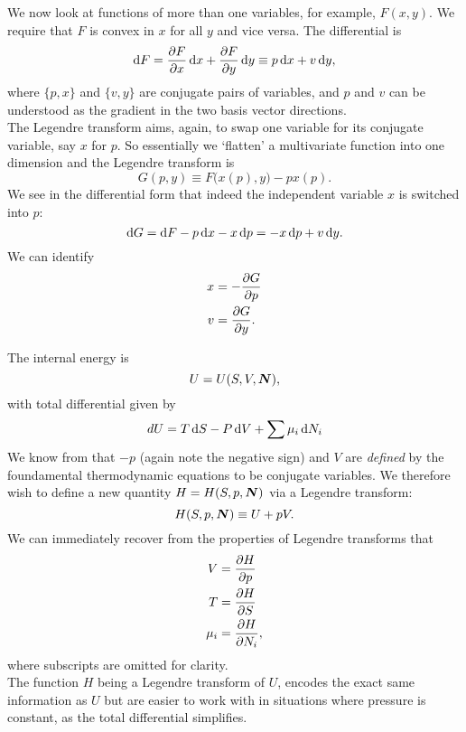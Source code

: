 We now look at functions of more than one variables, for example, $F(x,y)$. 
We require that $F$ is convex in $x$ for all $y$ and vice versa.
The differential is 
\begin{equation}
\dif F=\diffp Fx \dx + \diffp Fy \dif y\equiv p\dx+v\dif y,
\end{equation}
where $\{p,x\}$ and $\{v,y\}$ are conjugate pairs of variables, and $p$ and $v$ can be understood as the gradient in the two basis vector directions. \\
The Legendre transform aims, again, to swap one variable for its conjugate variable, say $x$ for $p$. 
So essentially we `flatten' a multivariate function into one dimension and the Legendre transform is 
\begin{equation}
G(p,y)\equiv F\bigr(x(p),y\bigl)-px(p).
\end{equation}
We see in the differential form that indeed the independent variable $x$ is switched into $p$:
\begin{equation}
\dif G=\dif F-p\dx-x\dif p=-x\dif p+v\dif y.
\end{equation}
We can identify
\begin{subequations}
\begin{align}
x&=-\diffp Gp \\
v&=\diffp Gy.
\end{align}
\end{subequations}
\begin{wex}
\label{wex_enthalpy}
The internal energy is
\begin{equation}
U=U(S,V,\boldsymbol{N}), 
\end{equation}
with total differential given by
\begin{equation}
dU=T\dif S-P\dif V+\sum \mu_i\dif N_i
\end{equation}
We know from  that $-p$ (again note the negative sign) and $V$ are \textit{defined} by the foundamental thermodynamic equations to be conjugate variables. 
We therefore wish to define a new quantity $H=H(S,p,\boldsymbol{N})$ via a Legendre transform:
\begin{equation}
H(S,p,\boldsymbol{N})\equiv U+pV.
\end{equation}
We can immediately recover from the properties of Legendre transforms that
\begin{subequations}
\begin{align}
V&=\diffp Hp\\
T&=\diffp HS\\
\mu_i&=\diffp{H}{N_i},
\end{align}
\end{subequations}
where subscripts are omitted for clarity. \\
The function $H$ being a Legendre transform of $U$, encodes the exact same information as $U$ but are easier to work with in situations where pressure is constant, as the total differential simplifies. 
\end{wex}
